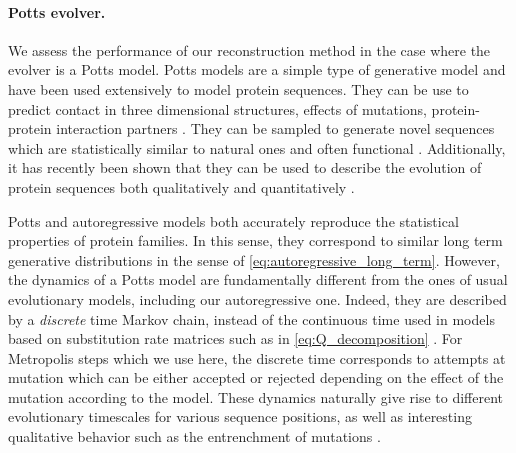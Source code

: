 \paragraph*{Potts evolver.} We assess the performance of our reconstruction method in the case where the evolver is a Potts model. 
Potts models are a simple type of generative model and have been used extensively to model protein sequences. 
They can be use to predict contact in three dimensional structures, effects of mutations, protein-protein interaction partners \cite{cocco_inversestatisticalphysics_2018}. 
They can be sampled to generate novel sequences which are statistically similar to natural ones and often functional \cite{russ_evolutionbasedmodeldesigning_2020,alvarez_vivofunctionalphenotypes_2024}.
Additionally, it has recently been shown that they can be used to describe the evolution of protein sequences both qualitatively and quantitatively \cite{bisardi_modelingsequencespaceexploration_2021}.

Potts and autoregressive models both accurately reproduce the statistical properties of protein families. 
In this sense, they correspond to similar long term generative distributions in the sense of \eqref{eq:autoregressive_long_term}. 
However, the dynamics of a Potts model are fundamentally different from the ones of usual evolutionary models, including our autoregressive one. 
Indeed, they are described by a \emph{discrete} time Markov chain, instead of the continuous time used in models based on substitution rate matrices such as in \eqref{eq:Q_decomposition} \cite{alvarez_vivofunctionalphenotypes_2024}. 
For Metropolis steps which we use here, the discrete time corresponds to attempts at mutation which can be either accepted or rejected depending on the effect of the mutation according to the model. 
These dynamics naturally give rise to different evolutionary timescales for various sequence positions, as well as interesting qualitative behavior such as the entrenchment of mutations \cite{bari_emergenttimescales_2024}. 

